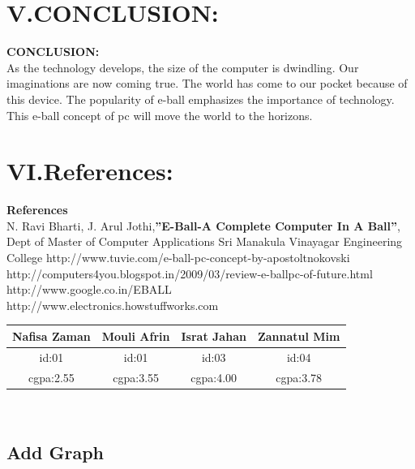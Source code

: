 \documentclass{article}
\begin{document}
  \section{V.CONCLUSION:}
               \textbf{CONCLUSION:}\\
  
   As the technology develops, the size of the computer is dwindling. Our imaginations are now coming true. The world has come to our pocket because of this device. The popularity of e-ball emphasizes the importance of technology. This e-ball concept of pc will move the world to the horizons.\\
     \newpage
     \section{VI.References:}
   \textbf{References}\\
   N. Ravi Bharti, J. Arul Jothi,\textbf{”E-Ball-A Complete Computer In A Ball”}, Dept of Master      of Computer Applications Sri Manakula Vinayagar Engineering College
  http://www.tuvie.com/e-ball-pc-concept-by-apostoltnokovski\\
  http://computers4you.blogspot.in/2009/03/review-e-ballpc-of-future.html\\
  http://www.google.co.in/EBALL \\
  http://www.electronics.howstuffworks.com\\
  
    \begin{tabular}{|c|c|c|c|}
    \hline
    Nafisa Zaman &Mouli Afrin &Israt Jahan &Zannatul Mim\\\hline
    id:01 &id:01 &id:03 &id:04\\\hline
    cgpa:2.55 &cgpa:3.55 &cgpa:4.00 &cgpa:3.78\\\hline
    \end{tabular}\\
  	[8 cm]
\subsection{Add Graph}
  
  
      
\end{document}
